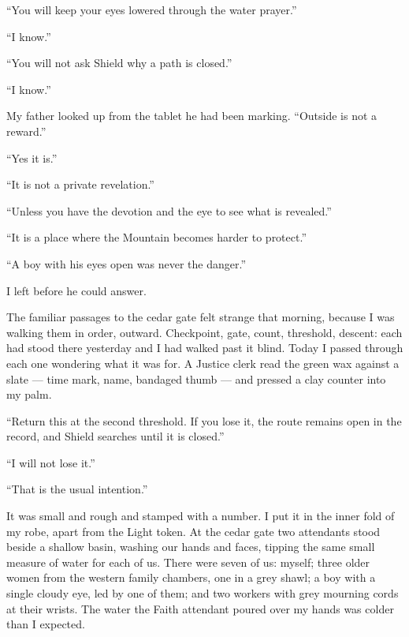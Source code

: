 ``You will keep your eyes lowered through the water prayer.''\par
``I know.''\par
``You will not ask Shield why a path is closed.''\par
``I know.''\par

My father looked up from the tablet he had been marking. ``Outside is not a reward.''\par

``Yes it is.''\par
``It is not a private revelation.''\par
``Unless you have the devotion and the eye to see what is revealed.''\par
``It is a place where the Mountain becomes harder to protect.''\par
``A boy with his eyes open was never the danger.'' \par

I left before he could answer.\par

\ornament

The familiar passages to the cedar gate felt strange that morning, because I was walking them in order, outward. Checkpoint, gate, count, threshold, descent: each had stood there yesterday and I had walked past it blind. Today I passed through each one wondering what it was for. A Justice clerk read the green wax against a slate --- time mark, name, bandaged thumb --- and pressed a clay counter into my palm.\par

``Return this at the second threshold. If you lose it, the route remains open in the record, and Shield searches until it is closed.''\par
``I will not lose it.''\par
``That is the usual intention.''\par

It was small and rough and stamped with a number. I put it in the inner fold of my robe, apart from the Light token. At the cedar gate two attendants stood beside a shallow basin, washing our hands and faces, tipping the same small measure of water for each of us. There were seven of us: myself; three older women from the western family chambers, one in a grey shawl; a boy with a single cloudy eye, led by one of them; and two workers with grey mourning cords at their wrists. The water the Faith attendant poured over my hands was colder than I expected.\par

